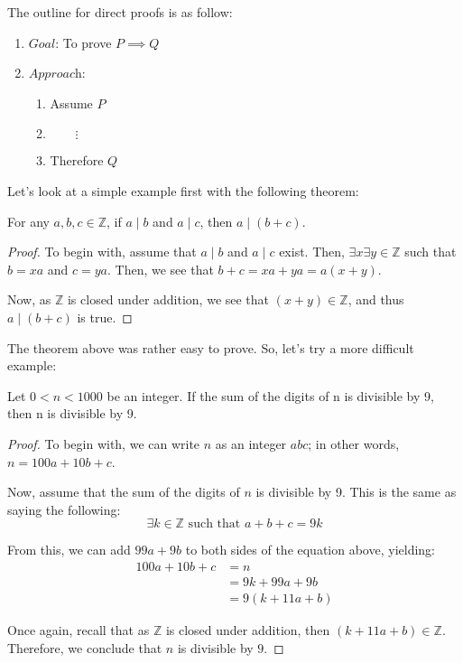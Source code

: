 \documentclass[openany]{book}
\begin{document}
The outline for direct proofs is as follow:
\begin{enumerate}
	\item[] $\textit{Goal}$: To prove $P\implies Q$
	\item[] $\textit{Approach}$:
	\begin{enumerate}
		\item[] Assume $P$
		\item[] $\qquad\vdots$
		\item[] Therefore $Q$
	\end{enumerate}
\end{enumerate}

Let's look at a simple example first with the following theorem:
\begin{thm}
	For any $a,b,c\in\mathbb{Z}$, if $a\mid b$ and $a\mid c$, then $a\mid(b+c)$.
\end{thm}
\begin{proof}
	To begin with, assume that $a\mid b$ and $a\mid c$ exist. Then, $\exists x \exists y \in \mathbb{Z}$ such that $b=xa$ and $c=ya$. Then, we see that $b+c = xa + ya = a(x+y)$.
	
	Now, as $\mathbb{Z}$ is closed under addition, we see that $(x+y)\in\mathbb{Z}$, and thus $a\mid(b+c)$ is true.
\end{proof}

The theorem above was rather easy to prove. So, let's try a more difficult example:
\begin{thm}
	Let $0 < n < 1000$ be an integer. If the sum of the digits of n is divisible by 9, then n is divisible by 9.
\end{thm}
\begin{proof}
	To begin with, we can write $n$ as an integer $abc$; in other words, $n=100a+10b+c$.
	
	Now, assume that the sum of the digits of $n$ is divisible by 9. This is the same as saying the following: 
	\begin{equation*}
		\exists k\in\mathbb{Z} \text{ such that } a+b+c=9k
	\end{equation*}
	
	From this, we can add $99a+9b$ to both sides of the equation above, yielding:
	\begin{align*}
		100a + 10b + c &= n \\
		&= 9k + 99a + 9b \\
		&= 9(k+11a+b)
	\end{align*}
	
	Once again, recall that as $\mathbb{Z}$ is closed under addition, then $(k+11a+b)\in\mathbb{Z}$. Therefore, we conclude that $n$ is divisible by $9$.
\end{proof}
\end{document}
